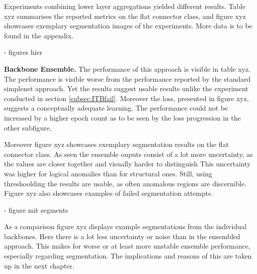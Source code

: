 



Experiments combining lower layer aggregations yielded different results. Table xyz summarises the reported metrics on the flat connector class, and figure xyz showcases exemplary 
segmentation images of the experiments. More data is to be found in the appendix.

- figures hier


\textbf{Backbone Ensemble.} The performance of this approach is visible in table xyz. The performance is visible worse from the performance 
reported by the standard simplenet approach. Yet the results suggest usable results unlike the experiment conducted in section \ref{subsec:ITBfail}. 
Moreover the loss, presented in figure xyz, suggests a conceptually adequate learning. The performance could not be increased by a higher 
epoch count as to be seen by the loss progression in the other subfigure.



Moreover figure xyz showcases exemplary segmentation results on the flat connector class. As 
seen the ensemble ouputs consist of a lot more uncertainty, as the values are closer together and visually harder to distinguish This uncertainty 
was higher for logical anomalies than for structural ones. Still, 
using threshoolding the results are usable, as often anomalous regions are discernible. Figure xyz also showcases examples of failed segmentation 
attempts. 

- figure mit segments 

As a comparison figure xyz displays example segmentations from the individual backbones. Here there is a lot less uncertainty or 
noise than in the ensembled approach. This makes for worse or at least more unstable ensemble performance, especially regarding segmentation. 
The implications and reasons of this are taken up in the next chapter.




